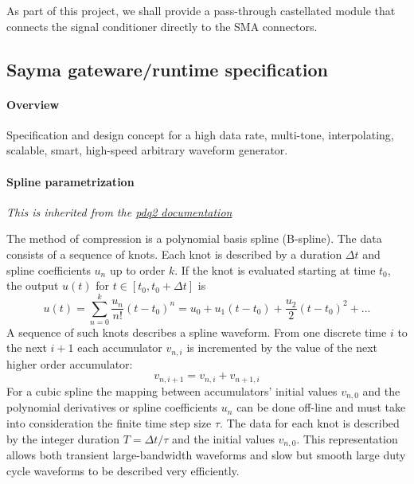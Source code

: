 \documentclass[11pt]{paper}
\begin{document}
As part of this project, we shall provide a pass-through castellated module that connects the signal conditioner directly to the SMA connectors.

\subsection{Sayma gateware/runtime specification}

\paragraph{Overview}

Specification and design concept for a high data rate, multi-tone, interpolating, scalable, smart, high-speed arbitrary waveform generator.

\paragraph{Spline parametrization}

\emph{This is inherited from the \href{http://pdq2.readthedocs.io/en/latest/}{pdq2 documentation}}

The method of compression is a polynomial basis spline (B-spline).
The data consists of a sequence of knots. Each knot is described by
a duration $\Delta t$ and spline coefficients $u_{n}$ up to order
$k$. If the knot is evaluated starting at time $t_{0}$, the output
$u(t)$ for $t\in[t_{0},t_{0}+\Delta t]$ is
$$
u(t)=\sum_{n=0}^{k}\frac{u_{n}}{n!}(t-t_{0})^{n}=u_{0}+u_{1}(t-t_{0})+\frac{u_{2}}{2}(t-t_{0})^{2}+...
$$
A sequence of such knots describes a spline waveform. From one discrete
time $i$ to the next $i+1$ each accumulator $v_{n,i}$ is incremented
by the value of the next higher order accumulator:
$$
v_{n,i+1}=v_{n,i}+v_{n+1,i}
$$
For a cubic spline the mapping between accumulators' initial values
$v_{n,0}$ and the polynomial derivatives or spline coefficients $u_{n}$
can be done off-line and must take into consideration the finite time
step size $\tau$. The data for each knot is described by the integer
duration $T=\Delta t/\tau$ and the initial values $v_{n,0}$. This
representation allows both transient large-bandwidth waveforms
and slow but smooth large duty cycle waveforms to be described very efficiently.
\end{document}
